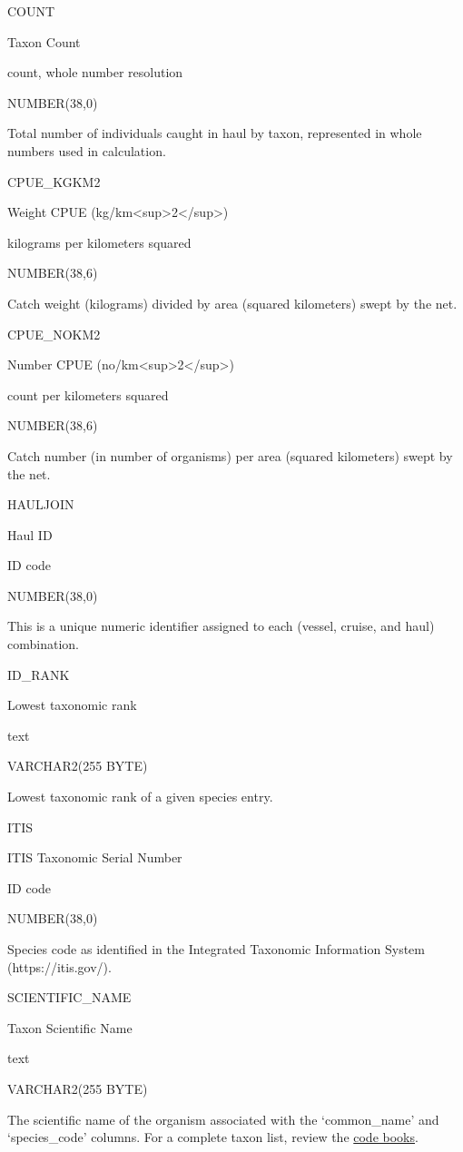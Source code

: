 \documentclass[
  letterpaper,
  oneside,
  open=any]{scrbook}
\begin{document}
COUNT

Taxon Count

count, whole number resolution

NUMBER(38,0)

Total number of individuals caught in haul by taxon, represented in
whole numbers used in calculation.

CPUE\_KGKM2

Weight CPUE (kg/km\textless sup\textgreater2\textless/sup\textgreater)

kilograms per kilometers squared

NUMBER(38,6)

Catch weight (kilograms) divided by area (squared kilometers) swept by
the net.

CPUE\_NOKM2

Number CPUE (no/km\textless sup\textgreater2\textless/sup\textgreater)

count per kilometers squared

NUMBER(38,6)

Catch number (in number of organisms) per area (squared kilometers)
swept by the net.

HAULJOIN

Haul ID

ID code

NUMBER(38,0)

This is a unique numeric identifier assigned to each (vessel, cruise,
and haul) combination.

ID\_RANK

Lowest taxonomic rank

text

VARCHAR2(255 BYTE)

Lowest taxonomic rank of a given species entry.

ITIS

ITIS Taxonomic Serial Number

ID code

NUMBER(38,0)

Species code as identified in the Integrated Taxonomic Information
System (https://itis.gov/).

SCIENTIFIC\_NAME

Taxon Scientific Name

text

VARCHAR2(255 BYTE)

The scientific name of the organism associated with the `common\_name'
and `species\_code' columns. For a complete taxon list, review the
\href{https://www.fisheries.noaa.gov/resource/document/groundfish-survey-species-code-manual-and-data-codes-manual}{code
books}.
\end{document}
